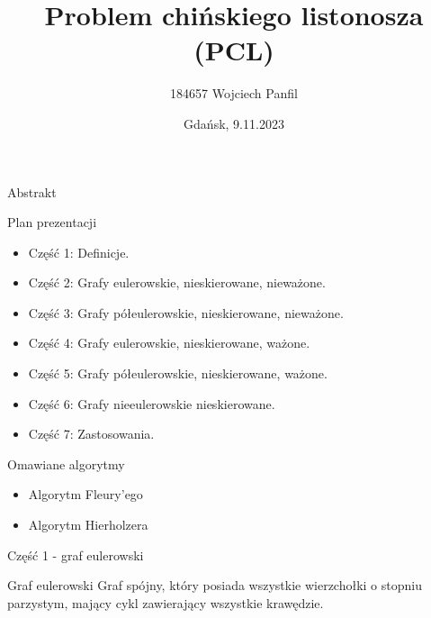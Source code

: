 \documentclass[polish,envcountsect,10pt]{beamer}
\title{Problem chińskiego listonosza (PCL)}
\author{184657 Wojciech Panfil}
\date{Gdańsk, 9.11.2023}
\begin{document}
\frame{\titlepage}

\begin{frame}{Abstrakt}
    \begin{block}{Plan prezentacji}
        \begin{itemize}
            \item Część 1: Definicje.
            \item Część 2: Grafy eulerowskie, nieskierowane, nieważone.
            \item Część 3: Grafy półeulerowskie, nieskierowane, nieważone.
            \item Część 4: Grafy eulerowskie, nieskierowane, ważone.
            \item Część 5: Grafy półeulerowskie, nieskierowane, ważone.
            \item Część 6: Grafy nieeulerowskie nieskierowane.
            \item Część 7: Zastosowania.
        \end{itemize}
    \end{block}
    \begin{block}{Omawiane algorytmy}
        \begin{itemize}
            \item Algorytm Fleury'ego
            \item Algorytm Hierholzera
        \end{itemize}
    \end{block}
\end{frame}

\begin{frame}{Część 1 - graf eulerowski}
    \begin{block}{Graf eulerowski}
        Graf spójny, który posiada wszystkie wierzchołki o stopniu parzystym, mający cykl zawierający wszystkie krawędzie.
    \end{block}
    \begin{center}
    \end{center}
\end{frame}
\end{document}
